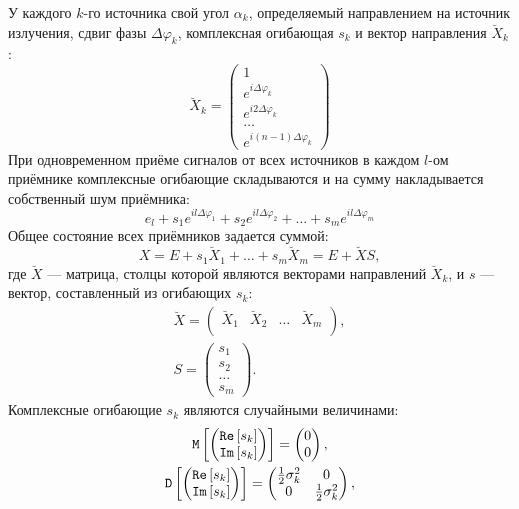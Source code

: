 У каждого $k$-го источника свой угол $\alpha_k$, определяемый направлением на источник излучения, сдвиг фазы $\Delta \varphi_k$, комплексная огибающая $s_k$ и
вектор направления $\breve{X}_k$:
\[
    \breve{X}_k =
    \begin{pmatrix}
        1                        \\
        e^{i \Delta \varphi_k}   \\
        e^{i 2 \Delta \varphi_k} \\
        \dots                    \\
        e^{i (n-1) \Delta \varphi_k}
    \end{pmatrix}
\]
При одновременном приёме сигналов от всех источников в каждом $l$-ом приёмнике комплексные огибающие складываются и на сумму накладывается собственный шум приёмника:
\[
    e_l + s_1 e^{i l \Delta \varphi_1} + s_2 e^{i l \Delta \varphi_2} + \dots + s_m e^{i l \Delta \varphi_m}
\]
Общее состояние всех приёмников задается суммой:
\[
    X
    = E + s_1 \breve{X}_1 + \dots + s_m \breve{X}_m
    = E + \breve{X} S,
\]
где $\breve{X}$ --- матрица, столцы которой являются векторами направлений $\breve{X}_k$, и $s$ --- вектор, составленный из огибающих $s_k$:
\begin{gather*}
    \breve{X} =
    \begin{pmatrix}
        \breve{X}_1 & \breve{X}_2 & \dots & \breve{X}_m \\
    \end{pmatrix}, \\
    S = \begin{pmatrix}
            s_1   \\
            s_2   \\
            \dots \\
            s_m
    \end{pmatrix} .
\end{gather*}
Комплексные огибающие $s_k$ являются случайными величинами:
\begin{gather*}
    \mathtt{M} \left [ 
        \begin{pmatrix}
            \mathtt{Re} \left [ s_k \right ] \\
            \mathtt{Im} \left [ s_k \right ]
        \end{pmatrix}
     \right ] =
    \begin{pmatrix}
        0 \\
        0
    \end{pmatrix} , \\
    \mathtt{D} \left [ 
        \begin{pmatrix}
            \mathtt{Re} \left [ s_k \right ] \\
            \mathtt{Im} \left [ s_k \right ]
        \end{pmatrix}
     \right ] =
    \begin{pmatrix}
        \frac{1}{2} \sigma_k^2 & 0                      \\
        0                      & \frac{1}{2} \sigma_k^2
    \end{pmatrix} ,
\end{gather*}
